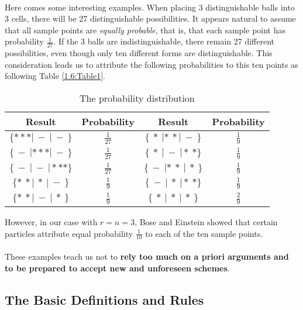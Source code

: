 \documentclass{article}
\numberwithin{equation}{subsection}
\begin{document}
			\paragraph{} Here comes some interesting examples. When placing 3 distinguishable balls into 3 cells, there will be 27 distinguishable possibilities. It appears natural to assume that all sample points are \textit{equally probable}, that is, that each sample point has probability $\frac{1}{27}$. If the 3 balls are indistinguishable, there remain 27 different possibilities, even though only ten different forms are distinguishable. This consideration leads us to attribute the following probabilities to this ten points as following Table \eqref{1.6:Table1}.
			\begin{table}
				\begin{center}
					\begin{tabular} {| c | c | c | c |}
						\hline
						Result & Probability & Result & Probability \\ \hline
						$\{***|\:-\:|\:-\:\}$ & $\frac{1}{27}$ & $\{\:*\:|*\:*|\:-\:\}$ & $\frac{1}{9}$ \\ \hline
						$\{\:-\:|***|\:-\:\}$ & $\frac{1}{27}$ & $\{\:*\:|\:-\:|*\:*\}$ & $\frac{1}{9}$ \\ \hline
						$\{\:-\:|\:-\:|***\}$ & $\frac{1}{27}$ & $\{\:-\:|*\:*\:|\:*\:\}$ & $\frac{1}{9}$ \\ \hline
						$\{*\:*|\:*\:|\:-\:\}$ & $\frac{1}{9}$ & $\{\:-\:|\:*\:|*\:*\}$ & $\frac{1}{9}$ \\ \hline
						$\{*\:*|\:-\:|\:*\:\}$ & $\frac{1}{9}$ & $\{\:*\:|\:*\:|\:*\:\}$ & $\frac{2}{9}$\\ \hline			
					\end{tabular}
					\caption{The probability distribution}
					\label{1.6:Table1}
				\end{center}
			\end{table}
			However, in our case with $r=n=3$, Bose and Einstein showed that certain particles attribute equal probability $\frac{1}{10}$ to each of the ten sample points.
			\paragraph{} These examples teach us not to \textbf{rely too much on a priori arguments and to be prepared to accept new and unforeseen schemes}.
		\subsection{The Basic Definitions and Rules}
\end{document}
